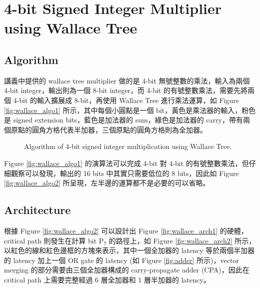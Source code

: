 \documentclass[12pt]{article}
\begin{document}
\section{4-bit Signed Integer Multiplier using Wallace Tree}

\subsection*{Algorithm}

講義中提供的 wallace tree multiplier 做的是 4-bit 無號整數的乘法，輸入為兩個 4-bit integer，輸出則為一個 8-bit integer，而 4-bit 的有號整數乘法，需要先將兩個 4-bit 的輸入擴展成 8-bit，再使用 Wallace Tree 進行乘法運算，如 Figure \ref{fig:wallace_algo1} 所示，其中每個小圓點是一個 bit，黃色是乘法器的輸入，粉色是 signed extension bits，藍色是加法器的 sum，綠色是加法器的 carry，帶有兩個原點的圓角方格代表半加器，三個原點的圓角方格則為全加器。

\begin{figure}[h]
    \centering
    \hfill
    \caption{Algorithm of 4-bit signed integer multiplication using Wallace Tree.}
\end{figure}

Figure \ref{fig:wallace_algo1} 的演算法可以完成 4-bit 對 4-bit 的有號整數乘法，但仔細觀察可以發現，輸出的 16 bits 中其實只需要低位的 8 bits，因此如 Figure \ref{fig:wallace_algo2} 所呈現，左半邊的運算都不是必要的可以省略。

\subsection*{Architecture}

根據 Figure \ref{fig:wallace_algo2} 可以設計出 Figure \ref{fig:wallace_arch1} 的硬體，critical path 則發生在計算 bit $\text{P}_\text{7}$ 的路徑上，如 Figure \ref{fig:wallace_arch2} 所示，以紅色的線和紅色邊框的方塊來表示，其中一個全加器的 latency 等於兩個半加器的 latency 加上一個 OR gate 的 latency (如 Figure \ref{fig:adder} 所示)，vector merging 的部分需要由三個全加器構成的 carry-propagate adder (CPA)，因此在 critical path 上需要完整經過 6 層全加器和 1 層半加器的 latency。
\end{document}
